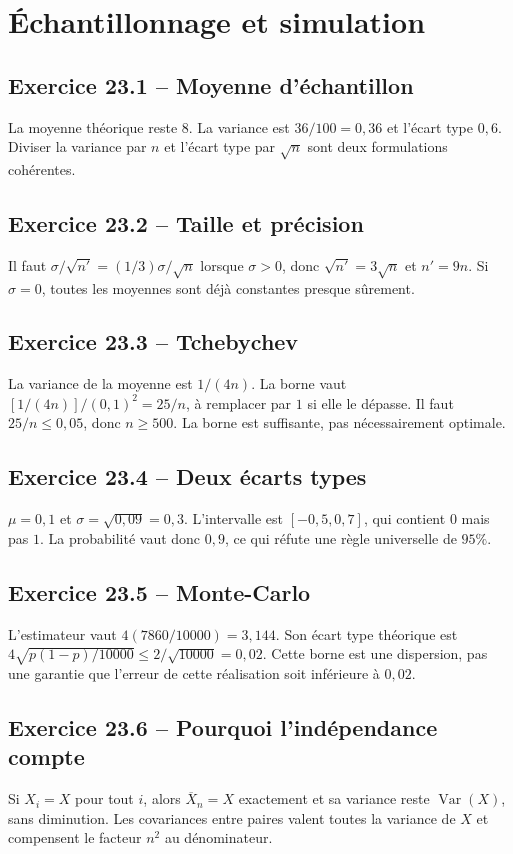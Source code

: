 \chapter{Échantillonnage et simulation}
\section*{Exercice 23.1 -- Moyenne d'échantillon}
La moyenne théorique reste $8$. La variance est $36/100=0{,}36$ et l'écart type $0{,}6$. Diviser la variance par $n$ et l'écart type par $\sqrt n$ sont deux formulations cohérentes.

\section*{Exercice 23.2 -- Taille et précision}
Il faut $\sigma/\sqrt{n'}=(1/3)\sigma/\sqrt n$ lorsque $\sigma>0$, donc $\sqrt{n'}=3\sqrt n$ et $n'=9n$. Si $\sigma=0$, toutes les moyennes sont déjà constantes presque sûrement.

\section*{Exercice 23.3 -- Tchebychev}
La variance de la moyenne est $1/(4n)$. La borne vaut $[1/(4n)]/(0{,}1)^2=25/n$, à remplacer par $1$ si elle le dépasse. Il faut $25/n\le0{,}05$, donc $n\ge500$. La borne est suffisante, pas nécessairement optimale.

\section*{Exercice 23.4 -- Deux écarts types}
$\mu=0{,}1$ et $\sigma=\sqrt{0{,}09}=0{,}3$. L'intervalle est $[-0{,}5,0{,}7]$, qui contient $0$ mais pas $1$. La probabilité vaut donc $0{,}9$, ce qui réfute une règle universelle de $95\%$.

\section*{Exercice 23.5 -- Monte-Carlo}
L'estimateur vaut $4(7860/10000)=3{,}144$. Son écart type théorique est $4\sqrt{p(1-p)/10000}\le2/\sqrt{10000}=0{,}02$. Cette borne est une dispersion, pas une garantie que l'erreur de cette réalisation soit inférieure à $0{,}02$.

\section*{Exercice 23.6 -- Pourquoi l'indépendance compte}
Si $X_i=X$ pour tout $i$, alors $\overline X_n=X$ exactement et sa variance reste $\operatorname{Var}(X)$, sans diminution. Les covariances entre paires valent toutes la variance de $X$ et compensent le facteur $n^2$ au dénominateur.
